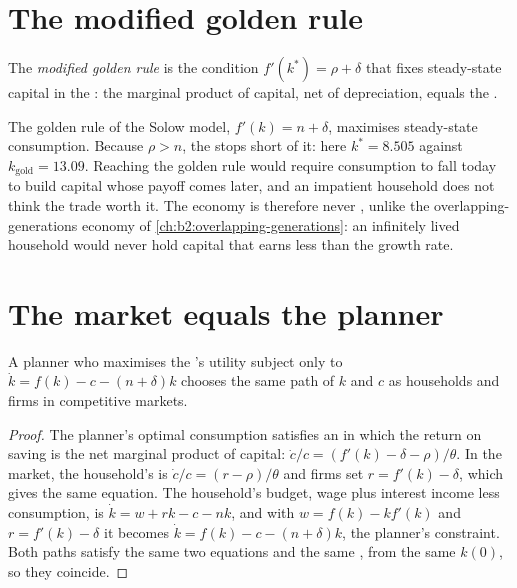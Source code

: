 \section{The modified golden rule}\label{sec:b2:ramsey-model:golden}

\begin{definition}\label{def:b2:ramsey-model:modified-golden-rule}
The \emph{modified golden rule} is the condition $f'(k^*) = \rho + \delta$ that fixes steady-state capital in the : the
marginal product of capital, net of depreciation, equals the .
\end{definition}

The golden rule of the Solow model, $f'(k) = n + \delta$, maximises steady-state consumption. Because $\rho > n$, the  stops short of it: here $k^* = 8.505$ against $k_{\mathrm{gold}} = 13.09$. Reaching the golden rule
would require consumption to fall today to build capital whose payoff comes later, and an impatient household does not
think the trade worth it. The economy is therefore never , unlike the overlapping-generations
economy of \cref{ch:b2:overlapping-generations}: an infinitely lived household would never hold capital that earns less than the growth rate.

\section{The market equals the planner}\label{sec:b2:ramsey-model:planner}

\begin{proposition}\label{prop:b2:ramsey-model:planner}
A planner who maximises the 's utility subject only to $\dot k = f(k) - c - (n + \delta)k$ chooses the same path of $k$ and $c$ as households
and firms in competitive markets.
\end{proposition}

\begin{proof}
The planner's optimal consumption satisfies an  in which the return on saving is the net marginal product
of capital: $\dot c/c = (f'(k) - \delta - \rho)/\theta$. In the market, the household's  is $\dot c/c = (r - \rho)/\theta$ and firms set $r = f'(k) - \delta$, which gives the same equation. The
household's budget, wage plus interest income less consumption, is $\dot k = w + rk - c - nk$, and with $w = f(k) - kf'(k)$ and $r = f'(k) - \delta$ it becomes $\dot k = f(k) - c - (n + \delta)k$, the planner's constraint. Both
paths satisfy the same two equations and the same , from the same $k(0)$, so they coincide.
\end{proof}

